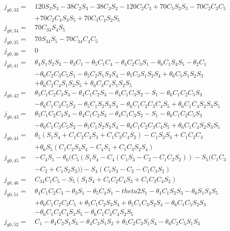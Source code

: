 \begin{equation*}
\begin{split}
j_{g0,33} =\  &120S_2S_3 - 38C_2S_3 - 38C_3S_2 - 120C_2C_3 + 70C_5S_2S_3 - 70C_2C_3C_5\\
		 	  & + 70C_2C_4S_3S_5+ 70C_3C_4S_2S_5\\
j_{g0,34} =\  &70C_{34}S_4S_5\\
j_{g0,35} =\  &70S_{34}S_5 - 70C_{34}C_4C_5\\
j_{g0,36} =\  &0\\
j_{g0,41} =\  &\theta _4S_1S_2S_3 - \theta _3C_1 - \theta _5C_1C_4 - \theta _4C_2C_3S_1 - \theta _6C_1S_4S_5 - \theta _2C_1\\
		 	  & - \theta _6C_2C_3C_5S_1- \theta _5C_2S_1S_3S_4 - \theta _5C_3S_1S_2S_4 + \theta _6C_5S_1S_2S_3\\
		 	  & + \theta _6C_2C_4S_1S_3S_5 + \theta _6C_3C_4S_1S_2S_5\\
j_{g0,42} =\  &\theta _5C_1C_2C_3S_4 - \theta _4C_1C_2S_3 - \theta _4C_1C_3S_2 - S_1 - \theta _6C_1C_2C_5S_3\\
		 	  & - \theta _6C_1C_3C_5S_2- \theta _5C_1S_2S_3S_4 - \theta _6C_1C_2C_3C_4S_5 + \theta _6C_1C_4S_2S_3S_5\\
j_{g0,43} =\  &\theta _5C_1C_2C_3S_4 - \theta _4C_1C_2S_3 - \theta _4C_1C_3S_2 - S_1 - \theta _6C_1C_2C_5S_3\\
		 	  & - \theta _6C_1C_3C_5S_2- \theta _5C_1S_2S_3S_4 - \theta _6C_1C_2C_3C_4S_5 + \theta _6C_1C_4S_2S_3S_5\\
j_{g0,44} =\  &\theta _5(S_1S_4 + C_1C_2C_4S_3 + C_1C_3C_4S_2) - C_1S_2S_3 + C_1C_2C_3\\
		 	  & + \theta _6S_5(C_1C_2S_3S_4- C_4S_1 + C_1C_3S_2S_4)\\
j_{g0,45} =\  &- C_4S_1 - \theta _6(C_5(S_1S_4 - C_4(C_1S_3-C_2 - C_1C_3S_2)) - S_5(C_1C_3\\
		 	  &-C_2 + C_1S_2S_3))- S_4(C_1S_3-C_2 - C_1C_3S_2)\\
j_{g0,46} =\  &C_{34}C_1C_5 - S_5(S_1S_4 + C_1C_2C_4S_3 + C_1C_3C_4S_2)\\
j_{g0,51} =\  &\theta _4C_1C_2C_3 - \theta _3S_1 - \theta _5C_4S_1 - theta2S_1 - \theta _4C_1S_2S_3 - \theta _6S_1S_4S_5\\
		 	  & + \theta _6C_1C_2C_3C_5+ \theta _5C_1C_2S_3S_4 + \theta _5C_1C_3S_2S_4 - \theta _6C_1C_5S_2S_3\\
		 	  & - \theta _6C_1C_2C_4S_3S_5 - \theta _6C_1C_3C_4S_2S_5\\
j_{g0,52} =\  &C_1 - \theta _4C_2S_1S_3 - \theta _4C_3S_1S_2 + \theta _5C_2C_3S_1S_4 - \theta _6C_2C_5S_1S_3\\

\end{split}
\end{equation*}

